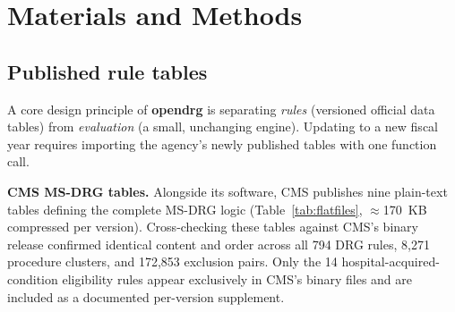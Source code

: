 \documentclass[fleqn,10pt]{IOMEDArticle}
\begin{document}

\section{Materials and Methods}
\label{sec:methods}

\subsection{Published rule tables}

A core design principle of \textbf{opendrg} is separating \emph{rules} (versioned official data tables) from \emph{evaluation} (a small, unchanging engine). Updating to a new fiscal year requires importing the agency's newly published tables with one function call.

\textbf{CMS MS-DRG tables.} Alongside its software, CMS publishes nine plain-text tables defining the complete MS-DRG logic (Table~\ref{tab:flatfiles}, $\approx$170~KB compressed per version). Cross-checking these tables against CMS's binary release confirmed identical content and order across all 794 DRG rules, 8{,}271 procedure clusters, and 172{,}853 exclusion pairs. Only the 14 hospital-acquired-condition eligibility rules appear exclusively in CMS's binary files and are included as a documented per-version supplement.
\end{document}
